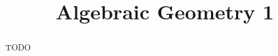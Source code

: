 \documentclass[11pt, letterpaper]{report}
\title{Algebraic Geometry 1}
\begin{document}
    \maketitle
    \tableofcontents

    \begin{abstract}
	    TODO
    \end{abstract}
    
    
    
    
    
    
    
    
\end{document}
